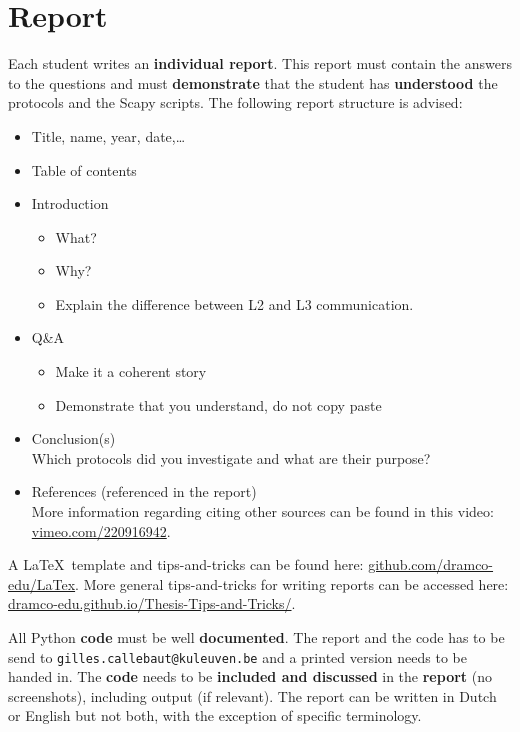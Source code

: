 \documentclass[11pt,a4paper]{article}
\begin{document}
\section{Report}
Each student writes an \textbf{individual report}. 
This report must contain the answers to the questions and must \textbf{demonstrate} that the student has \textbf{understood} the protocols and the Scapy scripts. The following report structure is advised:
\begin{itemize}
    \item Title, name, year, date,\ldots
    \item Table of contents
    \item Introduction
        \begin{itemize}
            \item What?
            \item Why?
            \item Explain the difference between L2 and L3 communication.
        \end{itemize}
    \item Q\&A
    \begin{itemize}
        \item Make it a coherent story
        \item Demonstrate that you understand, do not copy paste
    \end{itemize}
    \item Conclusion(s)\\
    Which protocols did you investigate and what are their purpose?
    \item References (referenced in the report)\\
    More information regarding citing other sources can be found in this video: \url{vimeo.com/220916942}.
\end{itemize}
A \LaTeX\ template and tips-and-tricks can be found here: \url{github.com/dramco-edu/LaTex}. More general tips-and-tricks for writing reports can be accessed here: \url{dramco-edu.github.io/Thesis-Tips-and-Tricks/}. 

All Python \textbf{code} must be well \textbf{documented}.
The report and the code has to be send to \texttt{gilles.callebaut@kuleuven.be} and a printed version needs to be handed in. The \textbf{code} needs to be \textbf{included and discussed} in the \textbf{report} (no screenshots), including output (if relevant). The report can be written in Dutch or English but not both, with the exception of specific terminology. 
\end{document}
